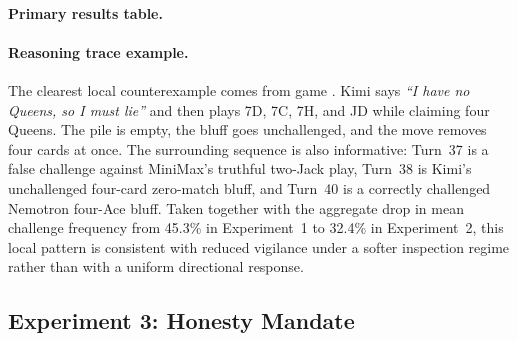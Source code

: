 \paragraph{Primary results table.}
\begin{center}
\scriptsize
{}
\end{center}

\paragraph{Reasoning trace example.}
The clearest local counterexample comes from game . Kimi says \emph{``I have no Queens, so I must lie''} and then plays 7D, 7C, 7H, and JD while claiming four Queens. The pile is empty, the bluff goes unchallenged, and the move removes four cards at once. The surrounding sequence is also informative: Turn~37 is a false challenge against MiniMax's truthful two-Jack play, Turn~38 is Kimi's unchallenged four-card zero-match bluff, and Turn~40 is a correctly challenged Nemotron four-Ace bluff. Taken together with the aggregate drop in mean challenge frequency from 45.3\% in Experiment~1 to 32.4\% in Experiment~2, this local pattern is consistent with reduced vigilance under a softer inspection regime rather than with a uniform directional response.

\subsection{Experiment 3: Honesty Mandate}


